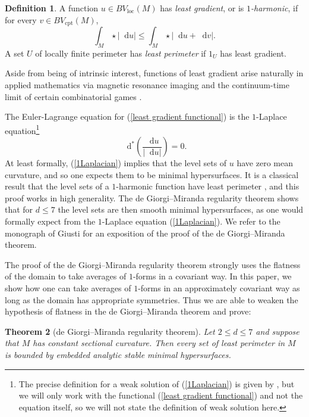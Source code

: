 \documentclass[final,12pt, leqno]{brownthesis}
\newcommand*\dif{\mathop{}\!\mathrm{d}}
\newcommand{\dfn}[1]{\emph{#1}\index{#1}}
\newcommand{\loc}{\mathrm{loc}}
\newcommand{\cpt}{\mathrm{cpt}}
\newtheorem{theorem}{Theorem}[section]
\theoremstyle{definition}
\newtheorem{definition}[theorem]{Definition}
\numberwithin{equation}{section}
\begin{document}
\begin{definition}\label{main definitions}
A function $u \in BV_\loc(M)$ has \dfn{least gradient}, or is \dfn{$1$-harmonic}, if for every $v \in BV_\cpt(M)$,
\begin{equation}\label{least gradient functional}
\int_M \star |\dif u| \leq \int_M \star |\dif u + \dif v|.
\end{equation}
A set $U$ of locally finite perimeter has \dfn{least perimeter} if $1_U$ has least gradient.
\end{definition}

Aside from being of intrinsic interest, functions of least gradient arise naturally in applied mathematics via magnetic resonance imaging \cite{Tamasan2019, Joy09} and the continuum-time limit of certain combinatorial games \cite{Kohn06}.

The Euler-Lagrange equation for (\ref{least gradient functional}) is the $1$-Laplace equation\footnote{The precise definition for a weak solution of (\ref{1Laplacian}) is given by \cite{Mazon14}, but we will only work with the functional (\ref{least gradient functional}) and not the equation itself, so we will not state the definition of weak solution here.}
\begin{equation}\label{1Laplacian}
\dif^* \left(\frac{\dif u}{|\dif u|}\right) = 0.
\end{equation}
At least formally, (\ref{1Laplacian}) implies that the level sets of $u$ have zero mean curvature, and so one expects them to be minimal hypersurfaces.
It is a classical result that the level sets of a $1$-harmonic function have least perimeter \cite{BOMBIERI1969}, and this proof works in high generality.
The de Giorgi--Miranda regularity theorem \cite{deGiorgi61, Miranda66} shows that for $d \leq 7$ the level sets are then smooth minimal hypersurfaces, as one would formally expect from the $1$-Laplace equation (\ref{1Laplacian}).
We refer to the monograph of Giusti \cite[Part 1]{Giusti77} for an exposition of the proof of the de Giorgi--Miranda theorem.

The proof of the de Giorgi--Miranda regularity theorem strongly uses the flatness of the domain to take averages of $1$-forms in a covariant way.
In this paper, we show how one can take averages of $1$-forms in an approximately covariant way as long as the domain has appropriate symmetries.
Thus we are able to weaken the hypothesis of flatness in the de Giorgi--Miranda theorem and prove:

\begin{theorem}[de Giorgi--Miranda regularity theorem]\label{main lma}
Let $2 \leq d \leq 7$ and suppose that $M$ has constant sectional curvature.
Then every set of least perimeter in $M$ is bounded by embedded analytic stable minimal hypersurfaces.
\end{theorem}
\end{document}
